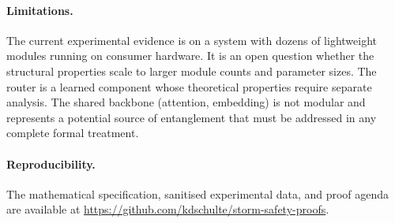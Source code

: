 \documentclass[11pt,a4paper]{article}
\begin{document}
\paragraph{Limitations.}
The current experimental evidence is on a system with dozens of lightweight modules running on consumer hardware.
It is an open question whether the structural properties scale to larger module counts and parameter sizes.
The router is a learned component whose theoretical properties require separate analysis.
The shared backbone (attention, embedding) is not modular and represents a potential source of entanglement that must be addressed in any complete formal treatment.

\paragraph{Reproducibility.}
The mathematical specification, sanitised experimental data, and proof agenda are available at \url{https://github.com/kdschulte/storm-safety-proofs}.
\end{document}
